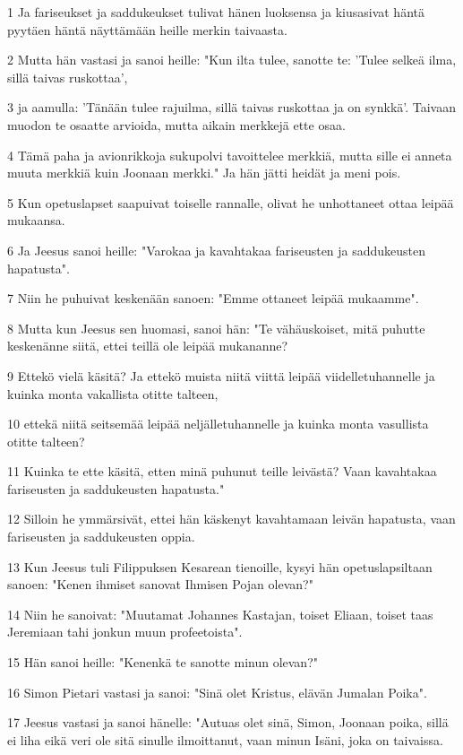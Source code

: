 \par 1 Ja fariseukset ja saddukeukset tulivat hänen luoksensa ja kiusasivat häntä pyytäen häntä näyttämään heille merkin taivaasta.
\par 2 Mutta hän vastasi ja sanoi heille: "Kun ilta tulee, sanotte te: 'Tulee selkeä ilma, sillä taivas ruskottaa',
\par 3 ja aamulla: 'Tänään tulee rajuilma, sillä taivas ruskottaa ja on synkkä'. Taivaan muodon te osaatte arvioida, mutta aikain merkkejä ette osaa.
\par 4 Tämä paha ja avionrikkoja sukupolvi tavoittelee merkkiä, mutta sille ei anneta muuta merkkiä kuin Joonaan merkki." Ja hän jätti heidät ja meni pois.
\par 5 Kun opetuslapset saapuivat toiselle rannalle, olivat he unhottaneet ottaa leipää mukaansa.
\par 6 Ja Jeesus sanoi heille: "Varokaa ja kavahtakaa fariseusten ja saddukeusten hapatusta".
\par 7 Niin he puhuivat keskenään sanoen: "Emme ottaneet leipää mukaamme".
\par 8 Mutta kun Jeesus sen huomasi, sanoi hän: "Te vähäuskoiset, mitä puhutte keskenänne siitä, ettei teillä ole leipää mukananne?
\par 9 Ettekö vielä käsitä? Ja ettekö muista niitä viittä leipää viidelletuhannelle ja kuinka monta vakallista otitte talteen,
\par 10 ettekä niitä seitsemää leipää neljälletuhannelle ja kuinka monta vasullista otitte talteen?
\par 11 Kuinka te ette käsitä, etten minä puhunut teille leivästä? Vaan kavahtakaa fariseusten ja saddukeusten hapatusta."
\par 12 Silloin he ymmärsivät, ettei hän käskenyt kavahtamaan leivän hapatusta, vaan fariseusten ja saddukeusten oppia.
\par 13 Kun Jeesus tuli Filippuksen Kesarean tienoille, kysyi hän opetuslapsiltaan sanoen: "Kenen ihmiset sanovat Ihmisen Pojan olevan?"
\par 14 Niin he sanoivat: "Muutamat Johannes Kastajan, toiset Eliaan, toiset taas Jeremiaan tahi jonkun muun profeetoista".
\par 15 Hän sanoi heille: "Kenenkä te sanotte minun olevan?"
\par 16 Simon Pietari vastasi ja sanoi: "Sinä olet Kristus, elävän Jumalan Poika".
\par 17 Jeesus vastasi ja sanoi hänelle: "Autuas olet sinä, Simon, Joonaan poika, sillä ei liha eikä veri ole sitä sinulle ilmoittanut, vaan minun Isäni, joka on taivaissa.
